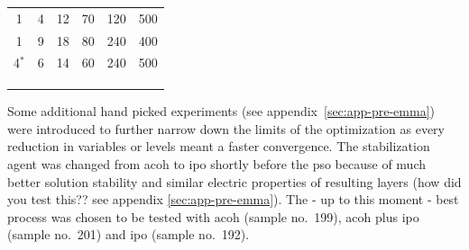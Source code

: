 {\begin{table}[hbt]
\begin{subtable}{0.5\linewidth}
\begin{tabular}{cccccc}
	1	&4	&12	&70	&120	&500	\\
	1	&9	&18	&80	&240	&400	\\
	4$^*$	&6	&14	&60	&240	&500	\\
			\hline
			\hline
			\\ \\  \\
		\end{tabular}
	\end{subtable}
\end{table}
}

Some additional hand picked experiments (see appendix~\ref{sec:app-pre-emma}) were introduced to further narrow down the limits of 
the optimization as every reduction in variables or levels meant a faster convergence.
The stabilization agent was changed from \gls{acoh} to \gls{ipo} 
shortly before the \gls{pso}
because of much better solution stability and similar electric properties of resulting layers (how did you test this?? see appendix \ref{sec:app-pre-emma}).
The - up to this moment - best process was chosen to be tested with 
 \gls{acoh} (sample no.~199),  \gls{acoh} plus  \gls{ipo} (sample no.~201) and  \gls{ipo} (sample no.~192).
